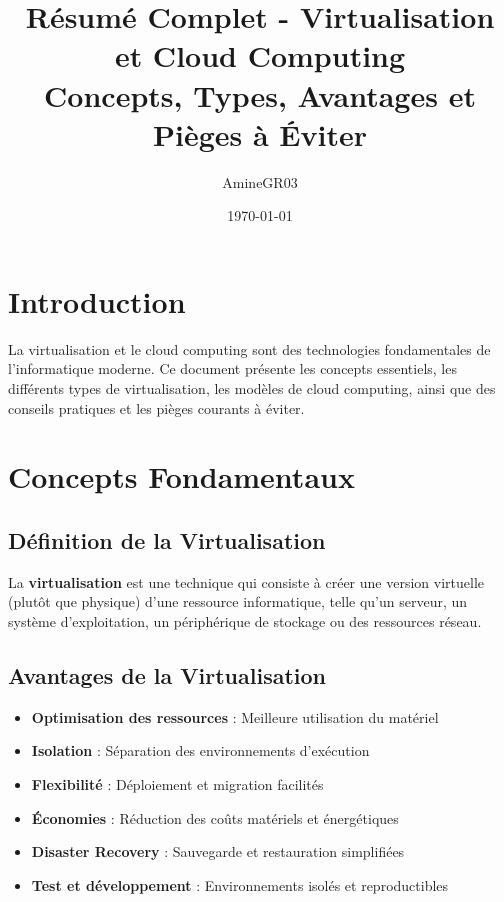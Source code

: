 \documentclass[11pt,a4paper]{article}
\title{Résumé Complet - Virtualisation et Cloud Computing\\
\large Concepts, Types, Avantages et Pièges à Éviter}
\author{AmineGR03}
\date{\today}
\begin{document}
\maketitle

\tableofcontents
\newpage

\section{Introduction}

La virtualisation et le cloud computing sont des technologies fondamentales de l'informatique moderne. Ce document présente les concepts essentiels, les différents types de virtualisation, les modèles de cloud computing, ainsi que des conseils pratiques et les pièges courants à éviter.

\section{Concepts Fondamentaux}

\subsection{Définition de la Virtualisation}

\begin{definitionbox}
La \textbf{virtualisation} est une technique qui consiste à créer une version virtuelle (plutôt que physique) d'une ressource informatique, telle qu'un serveur, un système d'exploitation, un périphérique de stockage ou des ressources réseau.
\end{definitionbox}

\subsection{Avantages de la Virtualisation}

\begin{itemize}
    \item \textbf{Optimisation des ressources} : Meilleure utilisation du matériel
    \item \textbf{Isolation} : Séparation des environnements d'exécution
    \item \textbf{Flexibilité} : Déploiement et migration facilités
    \item \textbf{Économies} : Réduction des coûts matériels et énergétiques
    \item \textbf{Disaster Recovery} : Sauvegarde et restauration simplifiées
    \item \textbf{Test et développement} : Environnements isolés et reproductibles
\end{itemize}
\end{document}
